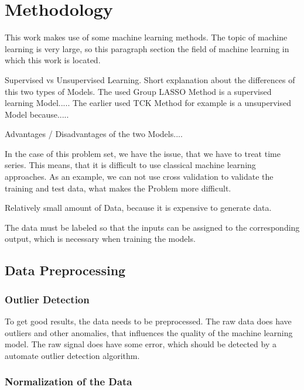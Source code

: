 \chapter{Methodology}
\label{chp:sample_chapter}

This work makes use of some machine learning methods. The topic of machine learning is very large, so this paragraph section the field of machine learning in which this work is located.

Supervised vs Unsupervised Learning. Short explanation about the differences of this two types of Models. The used Group LASSO Method is a supervised learning Model.....
The earlier used TCK Method for example is a unsupervised Model because.....

Advantages / Disadvantages of the two Models....

In the case of this problem set, we have the issue, that we have to treat time series. This means, that it is difficult to use classical machine learning approaches. As an example, we can not use cross validation to validate the training and test data, what makes the Problem more difficult.

Relatively small amount of Data, because it is expensive to generate data.

The data must be labeled so that the inputs can be assigned to the corresponding output, which is necessary when training the models.

\section{Data Preprocessing}
\label{sec:Data_Preprocessing}

\subsection{Outlier Detection}
\label{sec:Outlier_Detection}

To get good results, the data needs to be preprocessed. The raw data does have outliers and other anomalies, that influences the quality of the machine learning model. The raw signal does have some error, which should be detected by a automate outlier detection algorithm.


\subsection{Normalization of the Data}
\label{sec:Normalization_of_the_data}


